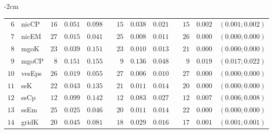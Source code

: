 \begin{table*}[!htbp]
\begin{adjustwidth*}{}{-2cm}
\begin{tabular}{@{}rlrrrrrrrrrcc@{}}
\footnotesize{$6 $} & \footnotesize{nicCP    } & \footnotesize{$16$} & \footnotesize{$0.051$} & \footnotesize{$0.098$} && \footnotesize{$15$} & \footnotesize{$0.038$} & \footnotesize{$0.021$} && \footnotesize{$15$} & \footnotesize{$0.002$} & \footnotesize{$(0.001;0.002)$} \\
\footnotesize{$7 $} & \footnotesize{nicEM    } & \footnotesize{$27$} & \footnotesize{$0.015$} & \footnotesize{$0.041$} && \footnotesize{$25$} & \footnotesize{$0.008$} & \footnotesize{$0.011$} && \footnotesize{$26$} & \footnotesize{$0.000$} & \footnotesize{$(0.000;0.000)$} \\
\footnotesize{$8 $} & \footnotesize{mgoK     } & \footnotesize{$23$} & \footnotesize{$0.039$} & \footnotesize{$0.151$} && \footnotesize{$23$} & \footnotesize{$0.010$} & \footnotesize{$0.013$} && \footnotesize{$21$} & \footnotesize{$0.000$} & \footnotesize{$(0.000;0.000)$} \\
\footnotesize{$9 $} & \footnotesize{mgoCP    } & \footnotesize{$8 $} & \footnotesize{$0.151$} & \footnotesize{$0.155$} && \footnotesize{$9 $} & \footnotesize{$0.136$} & \footnotesize{$0.048$} && \footnotesize{$9 $} & \footnotesize{$0.019$} & \footnotesize{$(0.017;0.022)$} \\
\footnotesize{$10$} & \footnotesize{vesEps   } & \footnotesize{$26$} & \footnotesize{$0.019$} & \footnotesize{$0.055$} && \footnotesize{$27$} & \footnotesize{$0.006$} & \footnotesize{$0.010$} && \footnotesize{$27$} & \footnotesize{$0.000$} & \footnotesize{$(0.000;0.000)$} \\
\footnotesize{$11$} & \footnotesize{ssK      } & \footnotesize{$22$} & \footnotesize{$0.043$} & \footnotesize{$0.135$} && \footnotesize{$21$} & \footnotesize{$0.011$} & \footnotesize{$0.014$} && \footnotesize{$20$} & \footnotesize{$0.000$} & \footnotesize{$(0.000;0.000)$} \\
\footnotesize{$12$} & \footnotesize{ssCp     } & \footnotesize{$12$} & \footnotesize{$0.099$} & \footnotesize{$0.142$} && \footnotesize{$12$} & \footnotesize{$0.083$} & \footnotesize{$0.027$} && \footnotesize{$12$} & \footnotesize{$0.007$} & \footnotesize{$(0.006;0.008)$} \\
\footnotesize{$13$} & \footnotesize{ssEm     } & \footnotesize{$25$} & \footnotesize{$0.025$} & \footnotesize{$0.046$} && \footnotesize{$20$} & \footnotesize{$0.011$} & \footnotesize{$0.014$} && \footnotesize{$22$} & \footnotesize{$0.000$} & \footnotesize{$(0.000;0.000)$} \\
\footnotesize{$14$} & \footnotesize{gridK    } & \footnotesize{$20$} & \footnotesize{$0.045$} & \footnotesize{$0.081$} && \footnotesize{$18$} & \footnotesize{$0.029$} & \footnotesize{$0.016$} && \footnotesize{$17$} & \footnotesize{$0.001$} & \footnotesize{$(0.001;0.001)$} \\

\end{tabular}
\end{adjustwidth*}
\end{table*}
